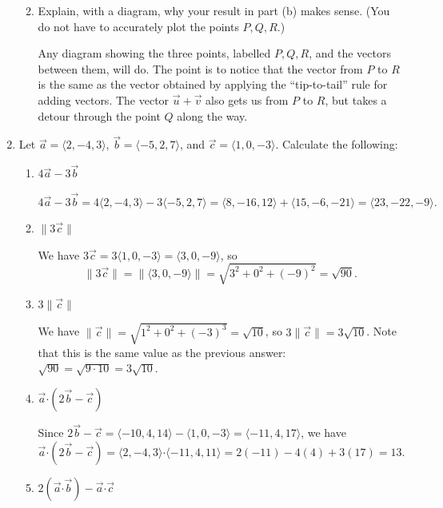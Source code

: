 \documentclass[12pt]{article}
\newcommand{\len}[1]{\lVert #1\rVert}
\newcommand{\dotp}{\boldsymbol{\cdot}}
\begin{document}
\begin{enumerate}
\begin{enumerate}
\medskip

 \item Explain, with a diagram, why your result in part (b) makes sense. (You do not have to accurately plot the points $P,Q,R$.)

\bigskip

Any diagram showing the three points, labelled $P,Q,R$, and the vectors between them, will do. The point is to notice that the vector from $P$ to $R$ is the same as the vector obtained by applying the ``tip-to-tail'' rule for adding vectors. The vector $\vec{u}+\vec{v}$ also gets us from $P$ to $R$, but takes a detour through the point $Q$ along the way.
\end{enumerate}
\newpage

\item Let $\vec{a} = \langle 2,-4,3\rangle$, $\vec{b} = \langle -5, 2, 7\rangle$, and $\vec{c} = \langle 1,0,-3\rangle$. Calculate the following:
\begin{enumerate}
 \item $4\vec{a}-3\vec{b}$

\[
 4\vec{a}-3\vec{b} = 4\langle 2,-4,3\rangle-3\langle -5,2,7\rangle = \langle 8,-16,12\rangle + \langle 15, -6,-21\rangle = \langle 23,-22,-9\rangle.
\]


 \item $\len{3\vec{c}}$

\medskip

We have $3\vec{c} = 3\langle 1,0,-3\rangle = \langle 3,0,-9\rangle$, so
\[
 \len{3\vec{c}} = \len{\langle 3,0,-9\rangle} = \sqrt{3^2+0^2+(-9)^2} = \sqrt{90}.
\]


 \item $3\len{\vec{c}}$

\medskip

We have $\len{\vec{c}} = \sqrt{1^2+0^2+(-3)^3} = \sqrt{10}$, so $3\len{\vec{c}} = 3\sqrt{10}$. Note that this is the same value as the previous answer: $\sqrt{90}=\sqrt{9\cdot 10}=3\sqrt{10}$.

\medskip

 \item $\vec{a}\dotp (2\vec{b}-\vec{c})$

\medskip

Since $2\vec{b}-\vec{c}  = \langle -10,4,14\rangle - \langle 1,0,-3\rangle = \langle -11,4,17\rangle$, we have
\[
 \vec{a}\dotp (2\vec{b}-\vec{c}) = \langle 2,-4,3\rangle\dotp \langle -11,4,11\rangle = 2(-11)-4(4)+3(17) = 13.
\]


 \item $2(\vec{a}\dotp \vec{b}) - \vec{a}\dotp\vec{c}$


\end{enumerate}
\end{enumerate}
\end{document}
